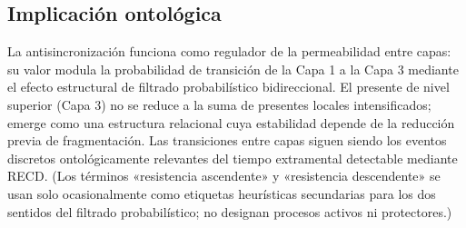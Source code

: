 \subsection{Implicación ontológica}

La antisincronización funciona como regulador de la permeabilidad entre capas: su valor modula la probabilidad de transición de la Capa 1 a la Capa 3 mediante el efecto estructural de filtrado probabilístico bidireccional. El presente de nivel superior (Capa 3) no se reduce a la suma de presentes locales intensificados; emerge como una estructura relacional cuya estabilidad depende de la reducción previa de fragmentación. Las transiciones entre capas siguen siendo los eventos discretos ontológicamente relevantes del tiempo extramental detectable mediante RECD. (Los términos «resistencia ascendente» y «resistencia descendente» se usan solo ocasionalmente como etiquetas heurísticas secundarias para los dos sentidos del filtrado probabilístico; no designan procesos activos ni protectores.)